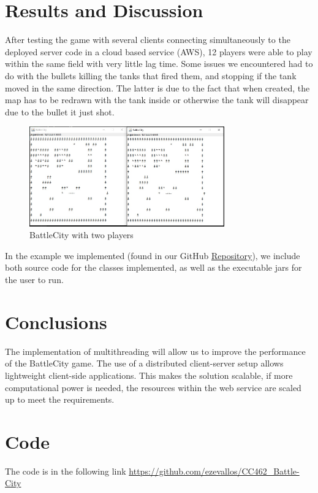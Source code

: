 \documentclass[10pt,a4paper]{article}
\theoremstyle{definition}
\begin{document}
\section{Results and Discussion}
After testing the game with several clients connecting simultaneously to the deployed server code in a cloud based service (AWS), 12 players were able to play within the same field with very little lag time. 
Some issues we encountered had to do with the bullets killing the tanks that fired them, and stopping if the tank moved in the same direction. 
The latter is due to the fact that when created, the map has to be redrawn with the tank inside or otherwise the tank will disappear due to the bullet it just shot.

\begin{figure}[H]
	\centering
	\includegraphics[width=0.75\textwidth]{battle.jpg}
	\caption{BattleCity with two players}
	\label{fig:battlecity}
\end{figure}

In the example we implemented (found in our GitHub \href{https://github.com/ezevallos/CC462_Battle-City}{Repository}), we include both source code for the classes implemented, as well as the executable jars for the user to run.

\section{Conclusions}
The implementation of multithreading will allow us to improve the performance of the BattleCity game. 
The use of a distributed client-server setup allows lightweight client-side applications. 
This makes the solution scalable, if more computational power is needed, the resources within the web service are scaled up to meet the requirements. 

\section{Code}
The code is in the following link \url{https://github.com/ezevallos/CC462_Battle-City}
\end{document}
